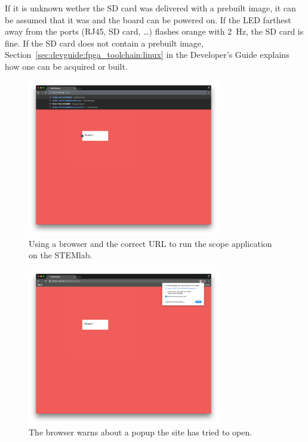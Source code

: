 If it  is unknown  wether the  SD card  was delivered  with a  prebuilt image,
it  can  be  assumed  that  it  was  and  the  board  can  be  powered  on. If
the  LED  farthest away  from  the  ports (RJ45,  SD  card,  \ldots )  flashes
orange  with \SI{2}{\Hz},  the SD  card  is fine.   If  the SD  card does  not
contain a  prebuilt image,  Section~\ref{sec:devguide:fpga_toolchain:linux} in
the Developer's Guide explains how one can be acquired or built.

\begin{figure}
    \centering
    \includegraphics[width=0.75\textwidth]{images/userguide/url}
    \caption[Entering the URL]{%
        Using a browser and the correct URL to run the scope application on
        the STEMlab.
    }
    \label{fig:userguide:url}
\end{figure}

\begin{figure}
    \centering
    \includegraphics[width=0.75\textwidth]{images/userguide/popup_warn}
    \caption[The popup warn popup]{%
        The browser warns about a popup the site has tried to open.
    }
    \label{fig:userguide:popup:warn}
\end{figure}

